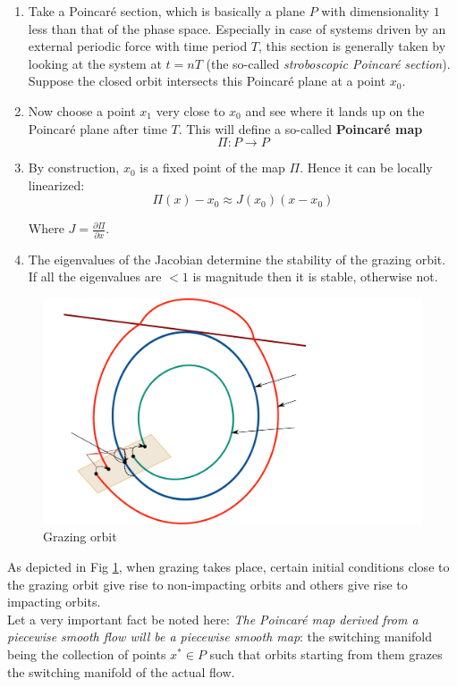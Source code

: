 \documentclass{book}
\renewcommand{\(}{\begin{columns}}
\renewcommand{\)}{\end{columns}}
\newcommand{\<}[1]{\begin{column}{#1}}
\renewcommand{\>}{\end{column}}
\newcommand{\bb}[1]{\textbf{#1}}
\begin{document}
\begin{enumerate}
\item Take a Poincaré section, which is basically a plane $P$ with dimensionality $1$ 
less than that of the phase space. Especially in case of systems driven by an 
external periodic force with time period $T$, this section is generally taken 
by looking at the system at $t=nT$ (the so-called \emph{stroboscopic Poincaré section}).
Suppose the closed orbit intersects this Poincaré plane at a point $x_0$. 

\item Now choose a point $x_1$ very close to $x_0$ and see where it lands  up 
on the Poincaré plane after time $T$. This will define a so-called 
\bb{Poincaré map}
\[
\Pi:P\to P
\]
\item By construction, $x_0$ is a fixed point of the map $\Pi$.  Hence it can 
be locally linearized:
\[
\Pi(x)-x_0\approx J(x_0)(x-x_0)
\]

Where $J=\frac{\partial \Pi}{\partial x}$.  
\item The eigenvalues of the Jacobian determine the stability of the grazing 
orbit.  If all the eigenvalues are $<1$ is magnitude then it is stable, 
otherwise not.  

\end{enumerate}
\begin{figure}[!htp]
\caption{Grazing orbit}
\label{fig-grazing-orbit}
\begin{center}
\includegraphics[width=0.6\columnwidth]{graz}
\end{center}
\end{figure}

As depicted in Fig \ref{fig-grazing-orbit}, when grazing takes place, certain 
initial conditions close to the grazing orbit give rise to non-impacting 
orbits and others give rise to impacting orbits.  \\


Let a very important fact be noted here: \emph{The Poincaré map derived from a 
piecewise smooth flow  
will be a piecewise smooth map}: the switching manifold being the collection of points 
$x^*\in P$ such that orbits starting from them grazes the switching manifold 
of the actual flow.  
\end{document}
